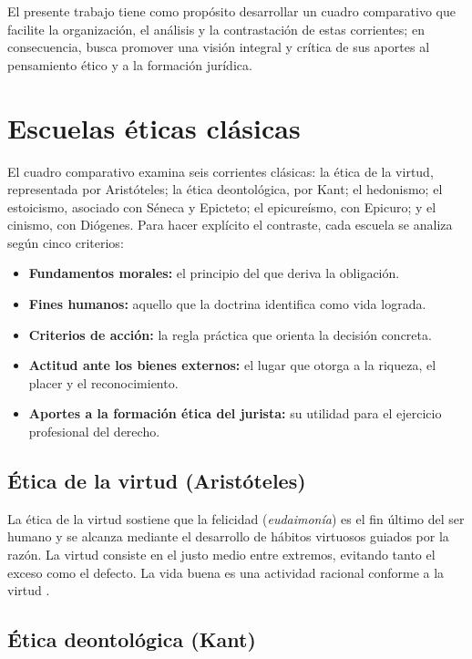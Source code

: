 \documentclass[
	spanish, %
	letterpaper, oneside
]{article}
\begin{document}
El presente trabajo tiene como propósito desarrollar un cuadro comparativo que facilite la organización, el análisis y la contrastación de estas corrientes; en consecuencia, busca promover una visión integral y crítica de sus aportes al pensamiento ético y a la formación jurídica.

\section{Escuelas éticas clásicas}

El cuadro comparativo examina seis corrientes clásicas: la ética de la virtud, representada por Aristóteles; la ética deontológica, por Kant; el hedonismo; el estoicismo, asociado con Séneca y Epicteto; el epicureísmo, con Epicuro; y el cinismo, con Diógenes. Para hacer explícito el contraste, cada escuela se analiza según cinco criterios:

\begin{itemize}
  \item \textbf{Fundamentos morales:} el principio del que deriva la obligación.
  \item \textbf{Fines humanos:} aquello que la doctrina identifica como vida lograda.
  \item \textbf{Criterios de acción:} la regla práctica que orienta la decisión concreta.
  \item \textbf{Actitud ante los bienes externos:} el lugar que otorga a la riqueza, el placer y el reconocimiento.
  \item \textbf{Aportes a la formación ética del jurista:} su utilidad para el ejercicio profesional del derecho.
\end{itemize}

\subsection*{Ética de la virtud (Aristóteles)}

La ética de la virtud sostiene que la felicidad (\textit{eudaimonía}) es el fin último del ser humano y se alcanza mediante el desarrollo de hábitos virtuosos guiados por la razón. La virtud consiste en el justo medio entre extremos, evitando tanto el exceso como el defecto. La vida buena es una actividad racional conforme a la virtud \citep{huerta2000etica}.

\subsection*{Ética deontológica (Kant)}
\end{document}
